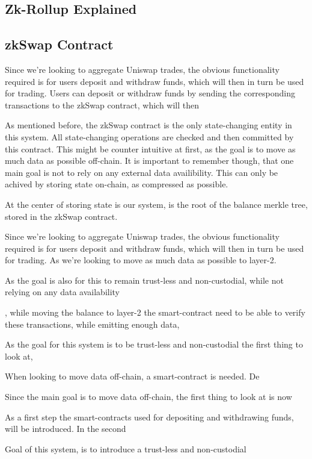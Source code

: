 \documentclass[11pt,twoside,a4paper,final]{book}
\begin{document}

\subsection{Zk-Rollup Explained}


\subsection{zkSwap Contract}
Since we're looking to aggregate Uniswap trades, the obvious functionality required is for users deposit and withdraw funds, which will then in turn be used for trading. Users can deposit or withdraw funds by sending the corresponding transactions to the zkSwap contract, which will then


As mentioned before, the zkSwap contract is the only state-changing entity in this system. All state-changing operations are checked and then committed by this contract. This might be counter intuitive at first, as the goal is to move as much data as possible off-chain. It is important to remember though, that one main goal is not to rely on any external data availibility. This can only be achived by storing state on-chain, as compressed as possible. 

At the center of storing state is our system, is the root of the balance merkle tree, stored in the zkSwap contract. 


Since we're looking to aggregate Uniswap trades, the obvious functionality required is for users deposit and withdraw funds, which will then in turn be used for trading. As we're looking to move as much data as possible to layer-2. 




As the goal is also for this to remain trust-less and non-custodial, while not relying on any data availability



, while moving the balance to layer-2 the smart-contract need to be able to verify these transactions, while emitting enough data,

As the goal for this system is to be trust-less and non-custodial the first thing to look at, 



When looking to move data off-chain, a smart-contract is needed. De

Since the main goal is to move data off-chain, the first thing to look at is now 


As a first step the smart-contracts used for depositing and withdrawing funds, will be introduced. In the second 




Goal of this system, is to introduce a trust-less and non-custodial 




\end{document}
